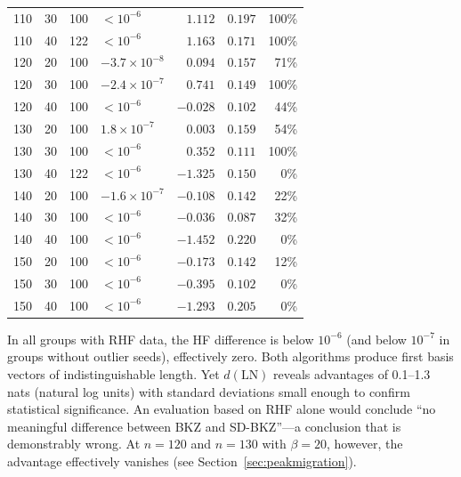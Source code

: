 \documentclass[journal=cic,version=preprint]{iacrj}
\begin{document}
\begin{table}[tbp]
\begin{tabular}{rrrlrrr}
110 & 30 & 100 & $<10^{-6}$ & $1.112$  & $0.197$ & 100\% \\
110 & 40 & 122 & $<10^{-6}$ & $1.163$  & $0.171$ & 100\% \\
120 & 20 & 100 & $-3.7\times 10^{-8}$  & $0.094$  & $0.157$ & 71\% \\
120 & 30 & 100 & $-2.4\times 10^{-7}$  & $0.741$  & $0.149$ & 100\% \\
120 & 40 & 100 & $<10^{-6}$ & $-0.028$ & $0.102$ & 44\% \\
130 & 20 & 100 & $1.8\times 10^{-7}$   & $0.003$  & $0.159$ & 54\% \\
130 & 30 & 100 & $<10^{-6}$ & $0.352$  & $0.111$ & 100\% \\
130 & 40 & 122 & $<10^{-6}$ & $-1.325$ & $0.150$ & 0\% \\
140 & 20 & 100 & $-1.6\times 10^{-7}$  & $-0.108$ & $0.142$ & 22\% \\
140 & 30 & 100 & $<10^{-6}$ & $-0.036$ & $0.087$ & 32\% \\
140 & 40 & 100 & $<10^{-6}$ & $-1.452$ & $0.220$ & 0\% \\
150 & 20 & 100 & $<10^{-6}$ & $-0.173$ & $0.142$ & 12\% \\
150 & 30 & 100 & $<10^{-6}$ & $-0.395$ & $0.102$ & 0\% \\
150 & 40 & 100 & $<10^{-6}$ & $-1.293$ & $0.205$ & 0\% \\
\hline
\end{tabular}
\end{table}

In all groups with RHF data, the HF difference is below $10^{-6}$ (and below $10^{-7}$ in groups without outlier seeds), effectively zero. Both algorithms produce first basis vectors of indistinguishable length. Yet $d(\mathrm{LN})$ reveals advantages of 0.1--1.3 nats (natural log units) with standard deviations small enough to confirm statistical significance. An evaluation based on RHF alone would conclude ``no meaningful difference between BKZ and SD-BKZ''---a conclusion that is demonstrably wrong. At $n=120$ and $n=130$ with $\beta=20$, however, the advantage effectively vanishes (see Section~\ref{sec:peakmigration}).
\end{document}
